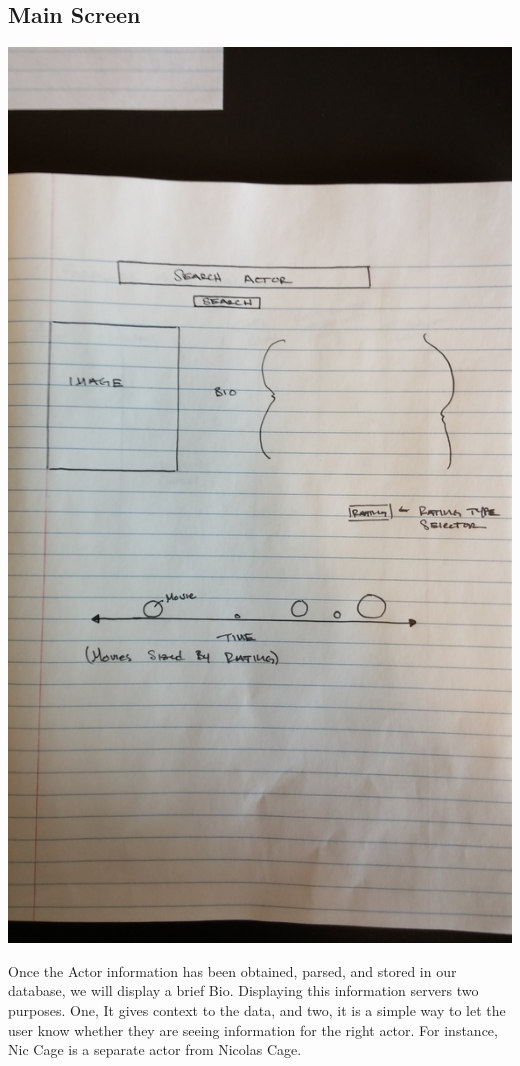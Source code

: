 \documentclass[12pt]{article}
\begin{document}
\subsection{Main Screen}
\begin{center}
 \includegraphics[angle=-90,scale=0.05]{main.jpg}
\end{center}
 Once the Actor information has been obtained, parsed, and stored in our database, we will display a brief Bio.  
 Displaying this information servers two purposes.  One, It gives context to the data, and two, it is a simple way to let the user know whether they are seeing information for the right actor.  For instance, Nic Cage is a separate actor from Nicolas Cage.
 
\end{document}
